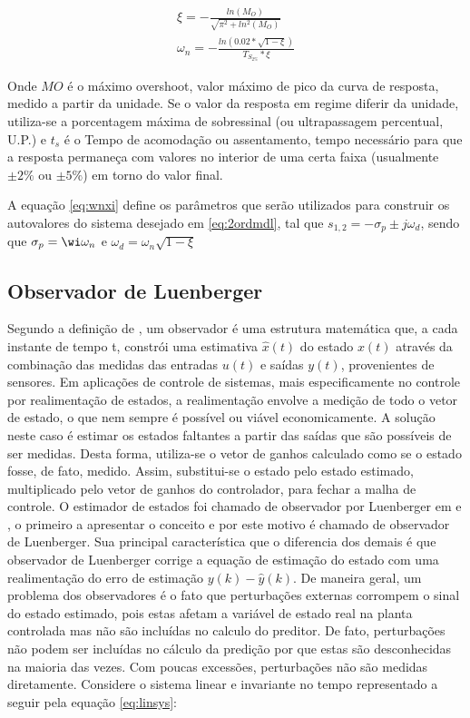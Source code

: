 \begin{equation} \label{eq:wnxi}
  \begin{split} 
    \xi=-\frac{ln\left( M_O \right)}{\sqrt{\pi^2+ln^2(M_O)}}\\
    \omega_n=-\frac{ln\left( 0.02*\sqrt{1-\xi} \right)}{T_{S_{2\%}}*\xi} 
  \end{split}
\end{equation}
  
Onde $MO$ é o máximo overshoot, valor máximo de pico da curva de resposta, medido a partir da unidade. Se o valor da resposta em regime diferir da unidade, utiliza-se a porcentagem máxima de sobressinal (ou ultrapassagem percentual, U.P.) e $t_s$ é o Tempo de acomodação ou assentamento, tempo necessário para que a resposta permaneça com valores no interior de uma certa faixa (usualmente $\pm2\%$ ou $\pm5\%$) em torno do valor final.

A equação \eqref{eq:wnxi} define os parâmetros que serão utilizados para construir os  autovalores do sistema desejado em \eqref{eq:2ordmdl}, tal que $s_{1,2}=-\sigma _p \pm j\omega _d$, sendo que $\sigma _p = \wi\omega _n$ e $\omega _{d}=\omega _{n} \sqrt{1-\xi}$ 
 
\subsection{Observador de Luenberger}\label{sc:luemberger}
Segundo a definição de \cite{EllisObserver}, um observador é uma estrutura matemática que, a cada instante de tempo t, constrói uma estimativa $\hat{x}(t)$ do estado $x(t)$ através da combinação das medidas das entradas $u(t)$ e saídas $y(t)$, provenientes de sensores. Em aplicações de controle de sistemas, mais especificamente no controle por realimentação de estados, a realimentação envolve a medição de todo o vetor de estado, o que nem sempre é possível ou viável economicamente. A solução neste caso é estimar os estados faltantes a partir das saídas que são possíveis de ser medidas. Desta forma, utiliza-se o vetor de ganhos calculado como se o estado fosse, de fato, medido. Assim, substitui-se o estado pelo estado estimado, multiplicado pelo vetor de ganhos do controlador, para fechar a malha de controle.
O estimador de estados foi chamado de observador por Luenberger em \cite{Luenberger1971AnObservers} e \cite{Luenberger}, o primeiro a apresentar o conceito e por este motivo é chamado de observador de Luenberger. Sua principal característica que o diferencia dos demais é que observador de Luenberger corrige a equação de estimação do estado com uma realimentação do erro de estimação $y(k)-\hat{y}(k)$.
De maneira geral, um problema dos observadores é o fato que perturbações externas corrompem o sinal do estado estimado, pois estas afetam a variável de estado real na planta controlada mas não são incluídas no calculo do preditor. De fato, perturbações não podem ser incluídas no cálculo da predição por que estas são desconhecidas na maioria das vezes. Com poucas excessões, perturbações não são medidas diretamente.
Considere o sistema linear e invariante no tempo representado a seguir pela equação \eqref{eq:linsys}:

